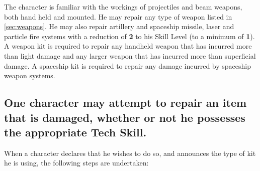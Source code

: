 \label{sec:skill-weapon-tech}

The character is familiar with the workings of projectiles and beam
weapons, both hand held and mounted.  He may repair any type of weapon
listed in \ref{sec:weapons}.  He may also repair artillery and spaceship
missile, laser and particle fire systems with a reduction of
\textbf{2} to his Skill Level (to a minimum of \textbf{1}).  A weapon
kit is required to repair any handheld weapon that has incurred more
than light damage and any larger weapon that has incurred more than
superficial damage.  A spaceship kit is required to repair any damage
incurred by spaceship weapon systems.

\subsection[Repair]{One character may attempt to repair an item that
  is damaged, whether or not he possesses the  appropriate Tech
  Skill.}
\label{sec:repair}

When a character declares that he wishes to do so, and announces the
type of kit he is using, the following steps are undertaken:

